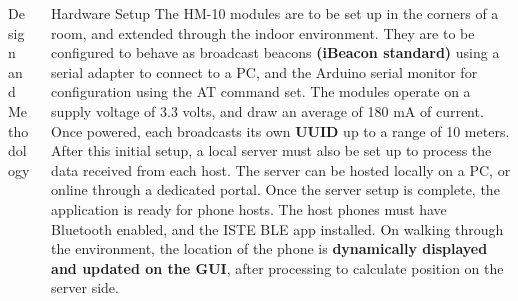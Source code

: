 \documentclass[final]{beamer}
\newlength{\onecolwid}
\newlength{\twocolwid}
\begin{document}
\begin{frame}[t]
\begin{columns}[t]
\begin{column}{\twocolwid}
\begin{columns}[t,totalwidth=\twocolwid]
\begin{column}{\onecolwid}
\begin{block}{Design and Methodology}
\end{block}


\end{column} %

\begin{column}{\onecolwid}\vspace{-.6in} %


\begin{block}{Hardware Setup}
The HM-10 modules are to be set up in the corners of a room, and extended through the indoor environment. They are to be configured to behave as broadcast beacons \textbf{(iBeacon standard)} using a serial adapter to connect to a PC, and the Arduino serial monitor for configuration using the AT command set. The modules operate on a supply voltage of 3.3 volts, and draw an average of 180 mA of current. Once powered, each broadcasts its own \textbf{UUID} up to a range of 10 meters. \\After this initial setup, a local server must also be set up to process the data received from each host. The server can be hosted locally on a PC, or online through a dedicated portal. Once the server setup is complete, the application is ready for phone hosts. The host phones must have Bluetooth enabled, and the ISTE BLE app installed. On walking through the environment, the location of the phone is \textbf{dynamically displayed and updated on the GUI}, after processing to calculate position on the server side.

\end{block}


\end{column} %

\end{columns} %



\end{column}
\end{columns}
\end{frame}
\end{document}
